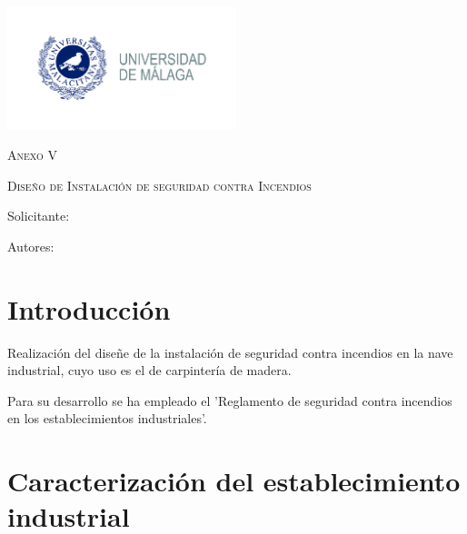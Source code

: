 \documentclass[../main.tex]{subfiles}
\begin{document}
\newpage
\thispagestyle{empty}
\begin{center}
    {\includegraphics[width=0.5\textwidth]{Imagenes/Logo UMA.jpg}\par}
    \vspace{1cm}
    {\bfseries\LARGE \Facultad \par}
    \vspace{0.5cm}
    {\scshape\Large \Grado \par}
    \vspace{1.5cm}
    {\scshape\Huge Anexo V \par}
    \vspace{1.5cm}
    {\scshape\Huge Diseño de Instalación de seguridad contra Incendios \par}
    \vspace{0.5cm}
    {\itshape\Large \TituloProyecto \par}
    \vfill
    {\Large Solicitante: \par}
    {\Large \Solicitante  \par}
    \vspace{1cm}
    {\Large Autores: \par}
    {\Large \Autora \par}
    {\Large \Autor \par}
    \vfill
    {\Large \Fecha \par}
\end{center}


\newpage

\section{Introducción}

Realización del diseñe de la instalación de seguridad contra incendios en la nave industrial, cuyo uso es el de carpintería de madera.

Para su desarrollo se ha empleado el 'Reglamento de seguridad contra incendios en los establecimientos industriales'.

\section{Caracterización del establecimiento industrial}
\end{document}
